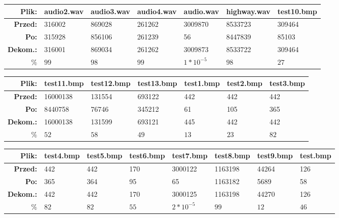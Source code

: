 \documentclass[12pt,a4paper,notitlepage]{report}
\begin{document}
\begin{table}[H]
\begin{tabular}{r|l|l|l|l|l|l|}
\hline
\textbf{Plik:} &audio2.wav&audio3.wav&audio4.wav&audio.wav&highway.wav&test10.bmp \\\hline
\textbf{Przed:} & 316002&869028&261262&3009870&8533723&309464 \\\hline
\textbf{Po:} & 315928&856106&261239&56&8447839&85103 \\\hline
\textbf{Dekom.:} & 316001&869034&261262&3009873&8533722&309464 \\\hline
\textbf{$\boldsymbol{\%}$} &$99$&$98$&$99$&$1*10^{-5}$&$98$&$27$ \\\hline
\end{tabular}
\end{table}

\begin{table}[H]
\begin{tabular}{r|l|l|l|l|l|l|}
\hline
\textbf{Plik:} &test11.bmp&test12.bmp&test13.bmp&test1.bmp&test2.bmp&test3.bmp \\\hline
\textbf{Przed:} &16000138&131554&693122&442&442&442 \\\hline
\textbf{Po:} & 8440758&76746&345212&61&105&365 \\\hline
\textbf{Dekom.:}& 16000138&131599&693121&445&442&442\\\hline
\textbf{$\boldsymbol{\%}$} &$52$&$58$&$49$&$13$&$23$&$82$ \\\hline
\end{tabular}
\end{table}


\begin{table}[H]
\begin{tabular}{r|l|l|l|l|l|l|l|}
\hline
\textbf{Plik:} &test4.bmp&test5.bmp&test6.bmp&test7.bmp&test8.bmp&test9.bmp&test.bmp \\\hline
\textbf{Przed:} &442&442&170&3000122&1163198&44264&126 \\\hline
\textbf{Po:} & 365&364&95&65&1163182&5689&58 \\\hline
\textbf{Dekom.:} &442&442&170&3000125&1163198&44270&126\\\hline
\textbf{$\boldsymbol{\%}$} &$82$&$82$&$55$&$2*10^{-5}$&$99$&$12$&$46$ \\\hline
\end{tabular}
\end{table}
\end{document}
